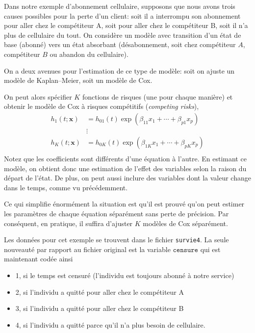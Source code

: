 \documentclass[
  11pt,
  letterpaper,
]{scrbook}
\providecommand{\tightlist}{%
  \setlength{\itemsep}{0pt}\setlength{\parskip}{0pt}}\usepackage{longtable,booktabs,array}
\theoremstyle{definition}
\theoremstyle{remark}
\begin{document}
Dans notre exemple d'abonnement cellulaire, supposons que nous avons
trois causes possibles pour la perte d'un client: soit il a interrompu
son abonnement pour aller chez le compétiteur A, soit pour aller chez le
compétiteur B, soit il n'a plus de cellulaire du tout. On considère un
modèle avec transition d'un état de base (abonné) vers un état absorbant
(désabonnement, soit chez compétiteur \(A\), compétiteur \(B\) ou
abandon du cellulaire).

On a deux avenues pour l'estimation de ce type de modèle: soit on ajuste
un modèle de Kaplan--Meier, soit un modèle de Cox.

On peut alors spécifier \(K\) fonctions de risques (une pour chaque
manière) et obtenir le modèle de Cox à risques compétitifs
(\emph{competing risks}), \begin{align*}
h_1(t; \boldsymbol{x})&= h_{01}(t) \exp(\beta_{11}x_1 + \cdots + \beta_{p1} x_p)\\
&\vdots\\
h_K(t; \boldsymbol{x})&= h_{0K}(t) \exp(\beta_{1K}x_1 + \cdots + \beta_{pK} x_p)\\
\end{align*} Notez que les coefficients sont différents d'une équation à
l'autre. En estimant ce modèle, on obtient donc une estimation de
l'effet des variables selon la raison du départ de l'état. De plus, on
peut aussi inclure des variables dont la valeur change dans le temps,
comme vu précédemment.

Ce qui simplifie énormément la situation est qu'il est prouvé qu'on peut
estimer les paramètres de chaque équation séparément sans perte de
précision. Par conséquent, en pratique, il suffira d'ajuster \(K\)
modèles de Cox séparément.

Les données pour cet exemple se trouvent dans le fichier
\texttt{survie4}. La seule nouveauté par rapport au fichier original est
la variable \(\texttt{censure}\) qui est maintenant codée ainsi

\begin{itemize}
\tightlist
\item
  1, si le temps est censuré (l'individu est toujours abonné à notre
  service)
\item
  2, si l'individu a quitté pour aller chez le compétiteur A
\item
  3, si l'individu a quitté pour aller chez le compétiteur B
\item
  4, si l'individu a quitté parce qu'il n'a plus besoin de cellulaire.
\end{itemize}
\end{document}
